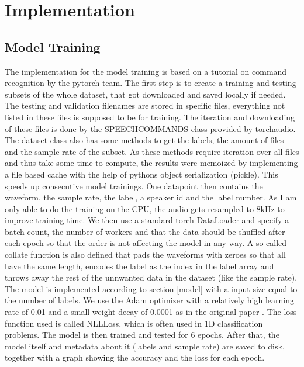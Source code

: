 \chapter{Implementation}

\section{Model Training}
The implementation for the model training is based on a tutorial on command recognition by the pytorch team\cite{tutorial}. The first step is to create a training and 
testing subsets of the whole dataset, that got downloaded and saved locally if needed. The testing and validation filenames are stored in specific files, everything not
listed in these files is supposed to be for training. The iteration and downloading of these files is done by the SPEECHCOMMANDS class provided by torchaudio. The dataset class
also has some methods to get the labels, the amount of files and the sample rate of the subset. As these methods require iteration over all files and thus take some time to compute, 
the results were memoized by implementing a file based cache with the help of pythons object serialization (pickle). This speeds up consecutive model trainings. One datapoint
then contains the waveform, the sample rate, the label, a speaker id and the label number. As I am only able to do the training on the CPU, the audio gets resampled
to 8kHz to improve training time. We then use a standard torch DataLoader and specify a batch count, the number of workers and that the data should be shuffled after each
epoch so that the order is not affecting the model in any way. A so called collate function is also defined that pads the waveforms with zeroes so that all have the same length, encodes
the label as the index in the label array and throws away the rest of the unnwanted data in the dataset (like the sample rate). The model is implemented according to section \ref{model} with
a input size equal to the number of labels. We use the Adam optimizer with a relatively high learning rate of 0.01 and a small weight decay of 0.0001 as in the original paper \cite{dai2016deep}.
The loss function used is called NLLLoss, which is often used in 1D classification problems. The model is then trained and tested for 6 epochs. After that, the model itself 
and metadata about it (labels and sample rate) are saved to disk, together with a graph showing the accuracy and the loss for each epoch.

